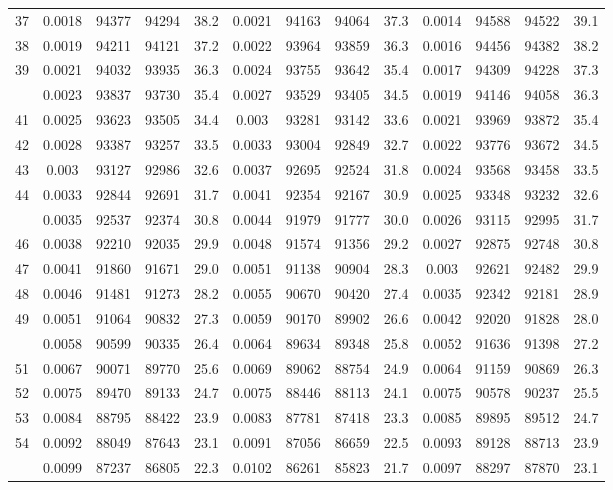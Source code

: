 \documentclass[
  14pt,
]{article}
\begin{document}
\begin{longtable}[t]{lcccccccccccc}
37 & 0.0018 & 94377 & 94294 & 38.2 & 0.0021 & 94163 & 94064 & 37.3 & 0.0014 & 94588 & 94522 & 39.1\\
38 & 0.0019 & 94211 & 94121 & 37.2 & 0.0022 & 93964 & 93859 & 36.3 & 0.0016 & 94456 & 94382 & 38.2\\
39 & 0.0021 & 94032 & 93935 & 36.3 & 0.0024 & 93755 & 93642 & 35.4 & 0.0017 & 94309 & 94228 & 37.3\\
\addlinespace
40 & 0.0023 & 93837 & 93730 & 35.4 & 0.0027 & 93529 & 93405 & 34.5 & 0.0019 & 94146 & 94058 & 36.3\\
41 & 0.0025 & 93623 & 93505 & 34.4 & 0.003 & 93281 & 93142 & 33.6 & 0.0021 & 93969 & 93872 & 35.4\\
42 & 0.0028 & 93387 & 93257 & 33.5 & 0.0033 & 93004 & 92849 & 32.7 & 0.0022 & 93776 & 93672 & 34.5\\
43 & 0.003 & 93127 & 92986 & 32.6 & 0.0037 & 92695 & 92524 & 31.8 & 0.0024 & 93568 & 93458 & 33.5\\
44 & 0.0033 & 92844 & 92691 & 31.7 & 0.0041 & 92354 & 92167 & 30.9 & 0.0025 & 93348 & 93232 & 32.6\\
\addlinespace
45 & 0.0035 & 92537 & 92374 & 30.8 & 0.0044 & 91979 & 91777 & 30.0 & 0.0026 & 93115 & 92995 & 31.7\\
46 & 0.0038 & 92210 & 92035 & 29.9 & 0.0048 & 91574 & 91356 & 29.2 & 0.0027 & 92875 & 92748 & 30.8\\
47 & 0.0041 & 91860 & 91671 & 29.0 & 0.0051 & 91138 & 90904 & 28.3 & 0.003 & 92621 & 92482 & 29.9\\
48 & 0.0046 & 91481 & 91273 & 28.2 & 0.0055 & 90670 & 90420 & 27.4 & 0.0035 & 92342 & 92181 & 28.9\\
49 & 0.0051 & 91064 & 90832 & 27.3 & 0.0059 & 90170 & 89902 & 26.6 & 0.0042 & 92020 & 91828 & 28.0\\
\addlinespace
50 & 0.0058 & 90599 & 90335 & 26.4 & 0.0064 & 89634 & 89348 & 25.8 & 0.0052 & 91636 & 91398 & 27.2\\
51 & 0.0067 & 90071 & 89770 & 25.6 & 0.0069 & 89062 & 88754 & 24.9 & 0.0064 & 91159 & 90869 & 26.3\\
52 & 0.0075 & 89470 & 89133 & 24.7 & 0.0075 & 88446 & 88113 & 24.1 & 0.0075 & 90578 & 90237 & 25.5\\
53 & 0.0084 & 88795 & 88422 & 23.9 & 0.0083 & 87781 & 87418 & 23.3 & 0.0085 & 89895 & 89512 & 24.7\\
54 & 0.0092 & 88049 & 87643 & 23.1 & 0.0091 & 87056 & 86659 & 22.5 & 0.0093 & 89128 & 88713 & 23.9\\
\addlinespace
55 & 0.0099 & 87237 & 86805 & 22.3 & 0.0102 & 86261 & 85823 & 21.7 & 0.0097 & 88297 & 87870 & 23.1\\

\end{longtable}
\end{document}
